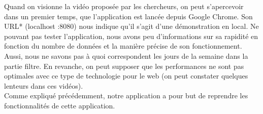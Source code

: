 \documentclass[12pt]{article}
\begin{document}
	Quand on visionne la vidéo proposée par les chercheurs, on peut s'apercevoir dans un premier
	temps, que l’application est lancée depuis Google Chrome. Son URL* (localhost :8080)
	nous indique qu’il s’agit d’une démonstration en local. Ne pouvant pas tester l’application,
	nous avons peu d’informations sur sa rapidité en fonction du nombre de données et la manière
	précise de son fonctionnement. Aussi, nous ne savons pas à quoi correspondent les jours de la
	semaine dans la partie filtre. En revanche, on peut supposer que les performances ne
	sont pas optimales avec ce type de technologie pour le web (on peut constater
	quelques lenteurs dans ces vidéos).\\
	Comme expliqué précédemment, notre application a pour but de reprendre les
	fonctionnalités de cette application.
	
	\newpage
\end{document}
